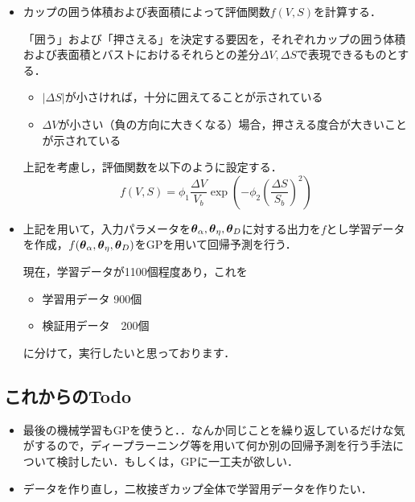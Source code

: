 \documentclass[11pt]{jsarticle}
\begin{document}
\begin{itemize}
				\item カップの囲う体積および表面積によって評価関数$ f(V,S) $を計算する．
				
				「囲う」および「押さえる」を決定する要因を，それぞれカップの囲う体積および表面積とバストにおけるそれらとの差分$\Delta V,\Delta S $で表現できるものとする．
				\begin{itemize}
					\item $ |\Delta S| $が小さければ，十分に囲えてることが示されている
					\item $ \Delta V $が小さい（負の方向に大きくなる）場合，押さえる度合が大きいことが示されている
				\end{itemize}
				上記を考慮し，評価関数を以下のように設定する．
				\begin{equation}\label{eq:EvalFunc}
					f(V,S) = \phi_1 \frac{\Delta V}{V_b} \exp \left(-\phi_2 \left(\frac{\Delta S}{S_b}\right)^2 \right)
				\end{equation}
				
				\item 上記を用いて，入力パラメータを$ \boldsymbol{\theta}_{\alpha},\boldsymbol{\theta}_{\eta},\boldsymbol{\theta}_{D} $に対する出力を$ f $とし学習データを作成，$ f(\boldsymbol{\theta}_{\alpha},\boldsymbol{\theta}_{\eta},\boldsymbol{\theta}_{D}) $をGPを用いて回帰予測を行う．
				
				現在，学習データが1100個程度あり，これを
				\begin{itemize}
					\item 学習用データ 900個
					\item 検証用データ　200個
				\end{itemize}
			に分けて，実行したいと思っております．
			\end{itemize}
		\subsection{これからのTodo}
			\begin{itemize}
				\item 最後の機械学習もGPを使うと．．なんか同じことを繰り返しているだけな気がするので，ディープラーニング等を用いて何か別の回帰予測を行う手法について検討したい．もしくは，GPに一工夫が欲しい．
				\item データを作り直し，二枚接ぎカップ全体で学習用データを作りたい．
			\end{itemize}
			
	\newpage
\vspace{10cm}

\vspace{14cm}
	\articleSPRfour
	\articleSPRfive
\end{document}
